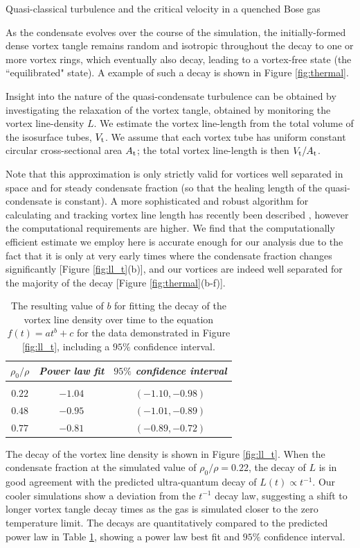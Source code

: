 \begin{chapter}{\label{cha:nonequib}Quasi-classical turbulence and the critical velocity in a quenched Bose gas}
\begin{figure}
\end{figure}
As the condensate evolves over the course of the simulation, the initially-formed dense vortex tangle remains random and isotropic throughout the decay to one or more vortex rings, which eventually also decay, leading to a vortex-free state (the ``equilibrated" state). A example of such a decay is shown in Figure \ref{fig:thermal}.

Insight into the nature of the quasi-condensate turbulence can be obtained by investigating the relaxation of the vortex tangle, obtained by monitoring the vortex line-density $L$. We estimate the vortex line-length from the total volume of the isosurface tubes, $V_{\rm t}$. We assume that each vortex tube has uniform constant circular cross-sectional area $A_{\rm t}$; the total vortex line-length is then $V_{\rm t}/A_{\rm t}$.

Note that this approximation is only strictly valid for vortices well separated in space and for steady condensate fraction (so that the healing length of the quasi-condensate is constant). A more sophisticated and robust algorithm for calculating and tracking vortex line length has recently been described \cite{Kerr14,Villois16}, however the computational requirements are higher. We find that the computationally efficient estimate we employ here is accurate enough for our analysis due to the fact that it is only at very early times where the condensate fraction changes significantly [Figure \ref{fig:ll_t}(b)], and our vortices are indeed well separated for the majority of the decay [Figure \ref{fig:thermal}(b-f)].

\begin{table}
\centering
\begin{tabular}{ccc}
{\it $\rho_0/\rho$} & {\it Power law fit} & {\it $95\%$ confidence interval} \\
\hline \\ [-2ex]
$0.22$ & $-1.04$ & $(-1.10, -0.98)$\\
$0.48$ & $-0.95$ & $(-1.01, -0.89)$\\
$0.77$ & $-0.81$ & $(-0.89, -0.72)$\\
\hline
\end{tabular}
\caption{The resulting value of $b$ for fitting the decay of the vortex line density over time to the equation $f(t) = at^b+c$ for the data demonstrated in Figure \ref{fig:ll_t}, including a $95\%$ confidence interval.}
\label{tbl:fits}
\end{table}

The decay of the vortex line density is shown in Figure \ref{fig:ll_t}. When the condensate fraction at the simulated value of $\rho_0/\rho = 0.22$, the decay of $L$ is in good agreement with the predicted ultra-quantum decay of $L(t) \propto t^{-1}$. Our cooler simulations show a deviation from the $t^{-1}$ decay law, suggesting a shift to longer vortex tangle decay times as the gas is simulated closer to the zero temperature limit. The decays are quantitatively compared to the predicted power law in Table \ref{tbl:fits}, showing a power law best fit and $95\%$ confidence interval.


\end{chapter}
